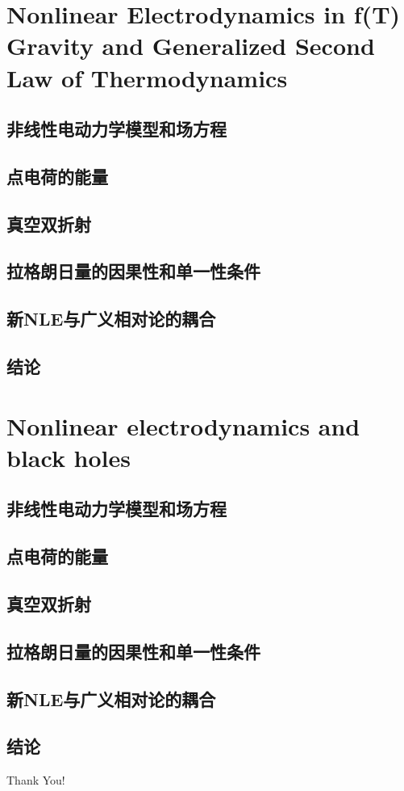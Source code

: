 \documentclass[9pt, dvipsnames]{beamer} %
\begin{document}
\section{Nonlinear Electrodynamics in f(T) Gravity and Generalized Second Law of Thermodynamics}



\subsection{非线性电动力学模型和场方程}

\subsection{点电荷的能量}

\subsection{真空双折射}

\subsection{拉格朗日量的因果性和单一性条件}

\subsection{新NLE与广义相对论的耦合}

\subsection{结论}



\section{Nonlinear electrodynamics and black holes}



\subsection{非线性电动力学模型和场方程}

\subsection{点电荷的能量}

\subsection{真空双折射}

\subsection{拉格朗日量的因果性和单一性条件}

\subsection{新NLE与广义相对论的耦合}

\subsection{结论}
    
\begin{frame}[noframenumbering]
    \centering
    {\fontsize{40}{50}\selectfont Thank You!}
\end{frame}
\end{document}
